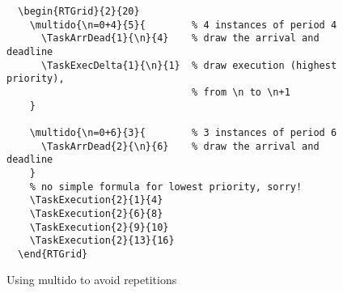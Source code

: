 \documentclass{article}
\begin{document}
\begin{figure}[h]
  \centering
  \begin{RTGrid}{2}{20}
 
  \end{RTGrid}

\begin{verbatim}
  \begin{RTGrid}{2}{20}
    \multido{\n=0+4}{5}{        % 4 instances of period 4 
      \TaskArrDead{1}{\n}{4}    % draw the arrival and deadline
      \TaskExecDelta{1}{\n}{1}  % draw execution (highest priority), 
                                % from \n to \n+1
    }
 
    \multido{\n=0+6}{3}{        % 3 instances of period 6 
      \TaskArrDead{2}{\n}{6}    % draw the arrival and deadline
    }
    % no simple formula for lowest priority, sorry!
    \TaskExecution{2}{1}{4}
    \TaskExecution{2}{6}{8}
    \TaskExecution{2}{9}{10}
    \TaskExecution{2}{13}{16}    
  \end{RTGrid}
\end{verbatim}
  \caption{Using multido to avoid repetitions}
  \label{fig:ex1a}
\end{figure}
\end{document}
